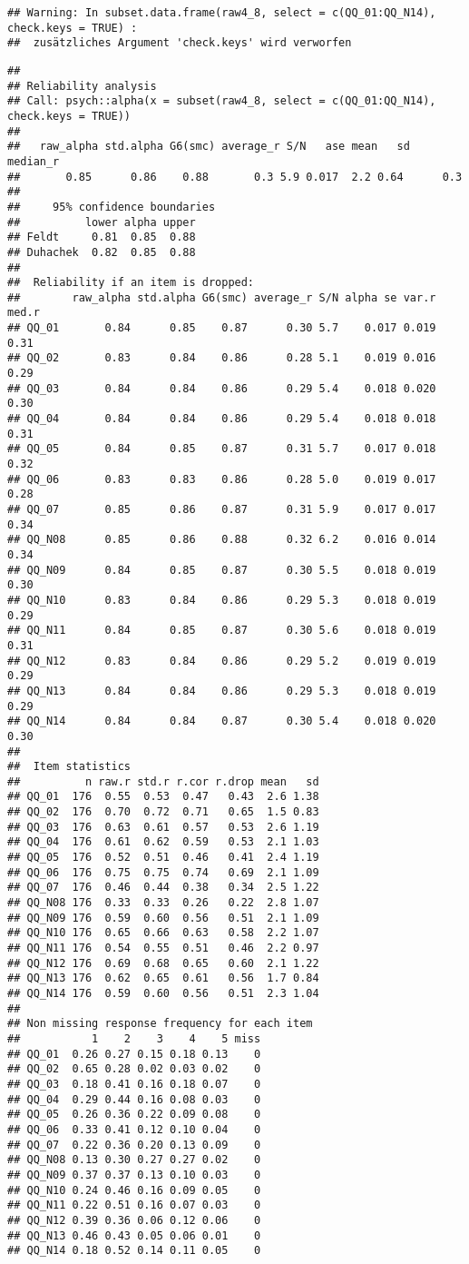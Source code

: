 \documentclass[
]{article}
\begin{document}
\begin{verbatim}
## Warning: In subset.data.frame(raw4_8, select = c(QQ_01:QQ_N14), check.keys = TRUE) :
##  zusätzliches Argument 'check.keys' wird verworfen
\end{verbatim}

\begin{verbatim}
## 
## Reliability analysis   
## Call: psych::alpha(x = subset(raw4_8, select = c(QQ_01:QQ_N14), check.keys = TRUE))
## 
##   raw_alpha std.alpha G6(smc) average_r S/N   ase mean   sd median_r
##       0.85      0.86    0.88       0.3 5.9 0.017  2.2 0.64      0.3
## 
##     95% confidence boundaries 
##          lower alpha upper
## Feldt     0.81  0.85  0.88
## Duhachek  0.82  0.85  0.88
## 
##  Reliability if an item is dropped:
##        raw_alpha std.alpha G6(smc) average_r S/N alpha se var.r med.r
## QQ_01       0.84      0.85    0.87      0.30 5.7    0.017 0.019  0.31
## QQ_02       0.83      0.84    0.86      0.28 5.1    0.019 0.016  0.29
## QQ_03       0.84      0.84    0.86      0.29 5.4    0.018 0.020  0.30
## QQ_04       0.84      0.84    0.86      0.29 5.4    0.018 0.018  0.31
## QQ_05       0.84      0.85    0.87      0.31 5.7    0.017 0.018  0.32
## QQ_06       0.83      0.83    0.86      0.28 5.0    0.019 0.017  0.28
## QQ_07       0.85      0.86    0.87      0.31 5.9    0.017 0.017  0.34
## QQ_N08      0.85      0.86    0.88      0.32 6.2    0.016 0.014  0.34
## QQ_N09      0.84      0.85    0.87      0.30 5.5    0.018 0.019  0.30
## QQ_N10      0.83      0.84    0.86      0.29 5.3    0.018 0.019  0.29
## QQ_N11      0.84      0.85    0.87      0.30 5.6    0.018 0.019  0.31
## QQ_N12      0.83      0.84    0.86      0.29 5.2    0.019 0.019  0.29
## QQ_N13      0.84      0.84    0.86      0.29 5.3    0.018 0.019  0.29
## QQ_N14      0.84      0.84    0.87      0.30 5.4    0.018 0.020  0.30
## 
##  Item statistics 
##          n raw.r std.r r.cor r.drop mean   sd
## QQ_01  176  0.55  0.53  0.47   0.43  2.6 1.38
## QQ_02  176  0.70  0.72  0.71   0.65  1.5 0.83
## QQ_03  176  0.63  0.61  0.57   0.53  2.6 1.19
## QQ_04  176  0.61  0.62  0.59   0.53  2.1 1.03
## QQ_05  176  0.52  0.51  0.46   0.41  2.4 1.19
## QQ_06  176  0.75  0.75  0.74   0.69  2.1 1.09
## QQ_07  176  0.46  0.44  0.38   0.34  2.5 1.22
## QQ_N08 176  0.33  0.33  0.26   0.22  2.8 1.07
## QQ_N09 176  0.59  0.60  0.56   0.51  2.1 1.09
## QQ_N10 176  0.65  0.66  0.63   0.58  2.2 1.07
## QQ_N11 176  0.54  0.55  0.51   0.46  2.2 0.97
## QQ_N12 176  0.69  0.68  0.65   0.60  2.1 1.22
## QQ_N13 176  0.62  0.65  0.61   0.56  1.7 0.84
## QQ_N14 176  0.59  0.60  0.56   0.51  2.3 1.04
## 
## Non missing response frequency for each item
##           1    2    3    4    5 miss
## QQ_01  0.26 0.27 0.15 0.18 0.13    0
## QQ_02  0.65 0.28 0.02 0.03 0.02    0
## QQ_03  0.18 0.41 0.16 0.18 0.07    0
## QQ_04  0.29 0.44 0.16 0.08 0.03    0
## QQ_05  0.26 0.36 0.22 0.09 0.08    0
## QQ_06  0.33 0.41 0.12 0.10 0.04    0
## QQ_07  0.22 0.36 0.20 0.13 0.09    0
## QQ_N08 0.13 0.30 0.27 0.27 0.02    0
## QQ_N09 0.37 0.37 0.13 0.10 0.03    0
## QQ_N10 0.24 0.46 0.16 0.09 0.05    0
## QQ_N11 0.22 0.51 0.16 0.07 0.03    0
## QQ_N12 0.39 0.36 0.06 0.12 0.06    0
## QQ_N13 0.46 0.43 0.05 0.06 0.01    0
## QQ_N14 0.18 0.52 0.14 0.11 0.05    0
\end{verbatim}
\end{document}
